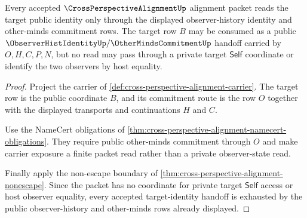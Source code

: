 \begin{theorem}
\label{thm:cross-perspective-alignment-observer-identity-handoff}
Every accepted $\CrossPerspectiveAlignmentUp$ alignment packet reads the target public identity only through the displayed observer-history identity and other-minds commitment rows. The target row $B$ may be consumed as a public $\ObserverHistIdentityUp/\OtherMindsCommitmentUp$ handoff carried by $O,H,C,P,N$, but no read may pass through a private target $\mathsf{Self}$ coordinate or identify the two observers by host equality.
\end{theorem}
\begin{proof}
Project the carrier of \autoref{def:cross-perspective-alignment-carrier}. The target row is the public coordinate $B$, and its commitment route is the row $O$ together with the displayed transports and continuations $H$ and $C$.

Use the NameCert obligations of \autoref{thm:cross-perspective-alignment-namecert-obligations}. They require public other-minds commitment through $O$ and make carrier exposure a finite packet read rather than a private observer-state read.

Finally apply the non-escape boundary of \autoref{thm:cross-perspective-alignment-nonescape}. Since the packet has no coordinate for private target $\mathsf{Self}$ access or host observer equality, every accepted target-identity handoff is exhausted by the public observer-history and other-minds rows already displayed.
\end{proof}

